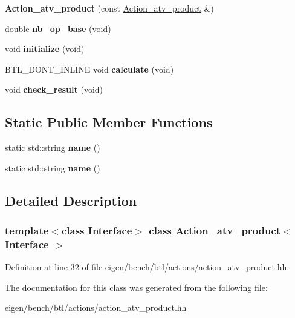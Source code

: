 \begin{DoxyCompactItemize}
{\bfseries Action\+\_\+atv\+\_\+product} (const \hyperlink{class_action__atv__product}{Action\+\_\+atv\+\_\+product} \&)
\item 
\mbox{\label{class_action__atv__product_af365acf025e52e3b4a26e4caf76a1d76}} 
double {\bfseries nb\+\_\+op\+\_\+base} (void)
\item 
\mbox{\label{class_action__atv__product_a7fab0f64a841f7ed9a52a00bb13dad6f}} 
void {\bfseries initialize} (void)
\item 
\mbox{\label{class_action__atv__product_afaa8f5ae6eb038bfb9c4916bdcc64545}} 
B\+T\+L\+\_\+\+D\+O\+N\+T\+\_\+\+I\+N\+L\+I\+NE void {\bfseries calculate} (void)
\item 
\mbox{\label{class_action__atv__product_a4824a1b1840c6da5cbf5cfa606d388aa}} 
void {\bfseries check\+\_\+result} (void)
\end{DoxyCompactItemize}
\subsection*{Static Public Member Functions}
\begin{DoxyCompactItemize}
\item 
\mbox{\label{class_action__atv__product_a8699cb086847ce168f603304634cb9b8}} 
static std\+::string {\bfseries name} ()
\item 
\mbox{\label{class_action__atv__product_a8699cb086847ce168f603304634cb9b8}} 
static std\+::string {\bfseries name} ()
\end{DoxyCompactItemize}


\subsection{Detailed Description}
\subsubsection*{template$<$class Interface$>$\newline
class Action\+\_\+atv\+\_\+product$<$ Interface $>$}



Definition at line \hyperlink{eigen_2bench_2btl_2actions_2action__atv__product_8hh_source_l00032}{32} of file \hyperlink{eigen_2bench_2btl_2actions_2action__atv__product_8hh_source}{eigen/bench/btl/actions/action\+\_\+atv\+\_\+product.\+hh}.



The documentation for this class was generated from the following file\+:\begin{DoxyCompactItemize}
\item 
eigen/bench/btl/actions/action\+\_\+atv\+\_\+product.\+hh\end{DoxyCompactItemize}
